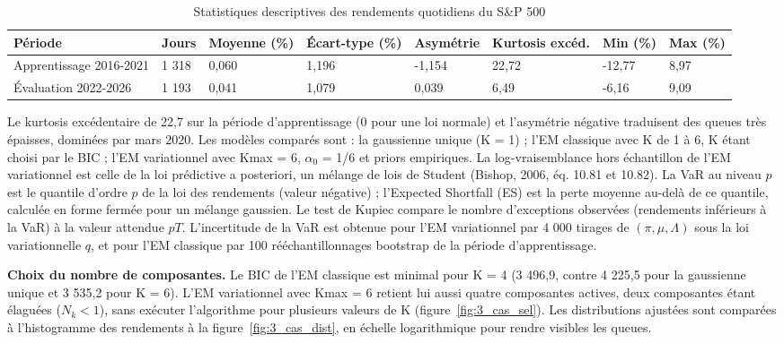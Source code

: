 \begin{table}[H]
\centering
\small
\setlength{\tabcolsep}{0.08cm}
\begin{tabular}{|p{3.6cm}|p{1.6cm}|p{1.5cm}|p{1.6cm}|p{1.5cm}|p{1.7cm}|p{1.4cm}|p{1.4cm}|}
\hline
\textbf{Période} & \textbf{Jours} & \textbf{Moyenne (\%)} & \textbf{Écart-type (\%)} & \textbf{Asymétrie} & \textbf{Kurtosis excéd.} & \textbf{Min (\%)} & \textbf{Max (\%)} \\
\hline
Apprentissage 2016-2021 & 1 318 & 0,060 & 1,196 & -1,154 & 22,72 & -12,77 & 8,97 \\
\hline
Évaluation 2022-2026 & 1 193 & 0,041 & 1,079 & 0,039 & 6,49 & -6,16 & 9,09 \\
\hline
\end{tabular}
\caption{Statistiques descriptives des rendements quotidiens du S\&P 500}
\label{tab:3_cas_desc}
\end{table}
Le kurtosis excédentaire de 22,7 sur la période d'apprentissage (0 pour une loi normale) et l'asymétrie négative traduisent des queues très épaisses, dominées par mars 2020. Les modèles comparés sont : la gaussienne unique (K = 1) ; l'EM classique avec K de 1 à 6, K étant choisi par le BIC ; l'EM variationnel avec Kmax = 6, $\alpha _{0}$ = 1/6 et priors empiriques. La log-vraisemblance hors échantillon de l'EM variationnel est celle de la loi prédictive a posteriori, un mélange de lois de Student (Bishop, 2006, éq. 10.81 et 10.82). La VaR au niveau $p$ est le quantile d'ordre $p$ de la loi des rendements (valeur négative) ; l'Expected Shortfall (ES) est la perte moyenne au-delà de ce quantile, calculée en forme fermée pour un mélange gaussien. Le test de Kupiec compare le nombre d'exceptions observées (rendements inférieurs à la VaR) à la valeur attendue $pT$. L'incertitude de la VaR est obtenue pour l'EM variationnel par 4 000 tirages de $(\pi ,\mu ,\Lambda )$ sous la loi variationnelle $q$, et pour l'EM classique par 100 rééchantillonnages bootstrap de la période d'apprentissage.

\textbf{Choix du nombre de composantes. }Le BIC de l'EM classique est minimal pour K = 4 (3 496,9, contre 4 225,5 pour la gaussienne unique et 3 535,2 pour K = 6). L'EM variationnel avec Kmax = 6 retient lui aussi quatre composantes actives, deux composantes étant élaguées ($N_{k} < 1$), sans exécuter l'algorithme pour plusieurs valeurs de K (figure~\ref{fig:3_cas_sel}). Les distributions ajustées sont comparées à l'histogramme des rendements à la figure~\ref{fig:3_cas_dist}, en échelle logarithmique pour rendre visibles les queues.

